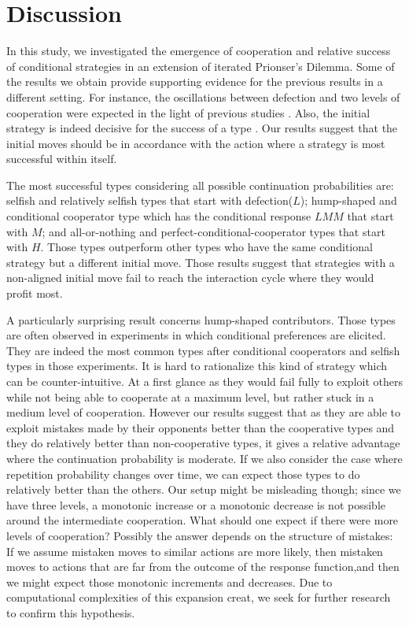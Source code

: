 \documentclass[12pt]{article}
\begin{document}
\section{Discussion}
 
In this study, we investigated the emergence of cooperation and relative success of conditional strategies in an extension of iterated Prionser's Dilemma. Some of the results we obtain provide supporting evidence for the previous results in a different setting. For instance, the oscillations between defection and two levels of cooperation were expected in the light of previous studies \citep{Wahl1999-nn, Nowak1989-vx, Bendor1995-zf, Imhof2005-ti, Van_Veelen2012-xf, Garcia2016-tr, Van_Veelen2012-xf}. Also, the initial strategy is indeed decisive for the success of a type \citep{Wahl1999-zi, Wahl1999-nn}. Our results suggest that the initial moves should be in accordance with the action where a strategy is most successful within itself. 


The most successful types considering all possible continuation probabilities are: selfish and relatively selfish types that start with defection($L$); hump-shaped and conditional cooperator type which has the conditional response $LMM$ that start with $M$; and all-or-nothing and perfect-conditional-cooperator types that start with $H$. Those types outperform other types who have the same conditional strategy but a different initial move. Those results suggest that strategies with a non-aligned initial move fail to reach the interaction cycle where they would profit most. 

A particularly surprising result concerns hump-shaped contributors. Those types are often observed in experiments in which conditional preferences are elicited. They are indeed the most common types after conditional cooperators and selfish types in those experiments. It is hard to rationalize this kind of strategy which can be counter-intuitive. At a first glance as they would fail fully to exploit others while not being able to cooperate at a maximum level,  but rather stuck in a medium level of cooperation. However our results suggest that as they are able to exploit mistakes made by their opponents better than the cooperative types and they do relatively better than non-cooperative types, it gives a relative advantage where the continuation probability is moderate. If we also consider the case where repetition probability changes over time, we can expect those types to do relatively better than the others. Our setup might be misleading though; since we have three levels, a monotonic increase or a monotonic decrease is not possible around the intermediate cooperation. What should one expect if there were more levels of cooperation? Possibly the answer depends on the structure of mistakes: If we assume mistaken moves to similar actions are more likely, then mistaken moves to actions that are far from the outcome of the response function,and then we might expect those monotonic increments and decreases. Due to computational complexities of this expansion creat, we seek for further research to confirm this hypothesis. 
\end{document}
